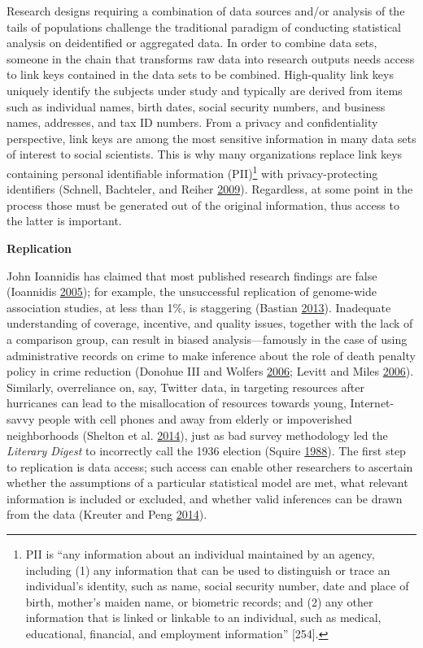 \documentclass[]{krantz}
\begin{document}
Research designs requiring a combination of data sources and/or analysis
of the tails of populations challenge the traditional paradigm of
conducting statistical analysis on deidentified or aggregated data. In
order to combine data sets, someone in the chain that transforms raw
data into research outputs needs access to link keys contained in the
data sets to be combined. High-quality link keys uniquely identify the
subjects under study and typically are derived from items such as
individual names, birth dates, social security numbers, and business
names, addresses, and tax ID numbers. From a privacy and confidentiality
perspective, link keys are among the most sensitive information in many
data sets of interest to social scientists. This is why many
organizations replace link keys containing personal identifiable
information (PII)\footnote{PII is ``any information about an individual
  maintained by an agency, including (1) any information that can be
  used to distinguish or trace an individual's identity, such as name,
  social security number, date and place of birth, mother's maiden name,
  or biometric records; and (2) any other information that is linked or
  linkable to an individual, such as medical, educational, financial,
  and employment information'' {[}254{]}.} with privacy-protecting
identifiers (Schnell, Bachteler, and Reiher
\protect\hyperlink{ref-schnell2009privacy}{2009}). Regardless, at some
point in the process those must be generated out of the original
information, thus access to the latter is important.

\textbf{Replication}

John Ioannidis has claimed that most published research findings are
false (Ioannidis \protect\hyperlink{ref-Ioannidis2005}{2005}); for
example, the unsuccessful replication of genome-wide association
studies, at less than 1\%, is staggering (Bastian
\protect\hyperlink{ref-Bastian2013}{2013}). Inadequate understanding of
coverage, incentive, and quality issues, together with the lack of a
comparison group, can result in biased analysis---famously in the case
of using administrative records on crime to make inference about the
role of death penalty policy in crime reduction (Donohue III and Wolfers
\protect\hyperlink{ref-donohue2006uses}{2006}; Levitt and Miles
\protect\hyperlink{ref-levitt2006economic}{2006}). Similarly,
overreliance on, say, Twitter data, in targeting resources after
hurricanes can lead to the misallocation of resources towards young,
Internet-savvy people with cell phones and away from elderly or
impoverished neighborhoods (Shelton et al.
\protect\hyperlink{ref-shelton2014mapping}{2014}), just as bad survey
methodology led the \emph{Literary Digest} to incorrectly call the 1936
election (Squire \protect\hyperlink{ref-squire19881936}{1988}). The
first step to replication is data access; such access can enable other
researchers to ascertain whether the assumptions of a particular
statistical model are met, what relevant information is included or
excluded, and whether valid inferences can be drawn from the data
(Kreuter and Peng \protect\hyperlink{ref-kreuter201412}{2014}).
\end{document}
